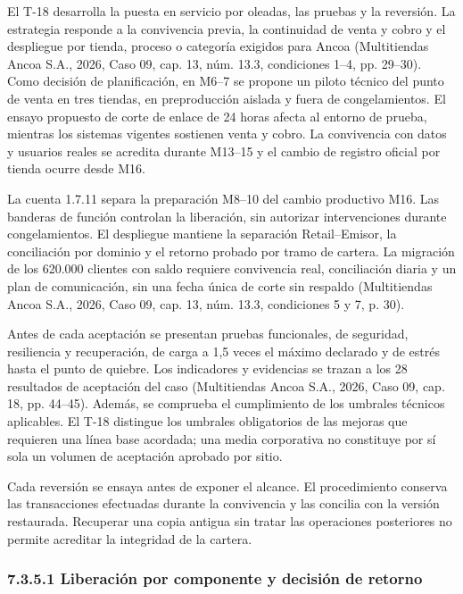 \documentclass[11pt]{article}
\begin{document}
El T-18 desarrolla la puesta en servicio por oleadas, las pruebas y la reversión. La estrategia responde a la convivencia previa, la continuidad de venta y cobro y el despliegue por tienda, proceso o categoría exigidos para Ancoa (Multitiendas Ancoa S.A., 2026, Caso 09, cap. 13, núm. 13.3, condiciones 1--4, pp. 29--30). Como decisión de planificación, en M6--7 se propone un piloto técnico del punto de venta en tres tiendas, en preproducción aislada y fuera de congelamientos. El ensayo propuesto de corte de enlace de 24 horas afecta al entorno de prueba, mientras los sistemas vigentes sostienen venta y cobro. La convivencia con datos y usuarios reales se acredita durante M13--15 y el cambio de registro oficial por tienda ocurre desde M16.

La cuenta 1.7.11 separa la preparación M8--10 del cambio productivo M16. Las banderas de función controlan la liberación, sin autorizar intervenciones durante congelamientos. El despliegue mantiene la separación Retail--Emisor, la conciliación por dominio y el retorno probado por tramo de cartera. La migración de los 620.000 clientes con saldo requiere convivencia real, conciliación diaria y un plan de comunicación, sin una fecha única de corte sin respaldo (Multitiendas Ancoa S.A., 2026, Caso 09, cap. 13, núm. 13.3, condiciones 5 y 7, p. 30).

Antes de cada aceptación se presentan pruebas funcionales, de seguridad, resiliencia y recuperación, de carga a 1,5 veces el máximo declarado y de estrés hasta el punto de quiebre. Los indicadores y evidencias se trazan a los 28 resultados de aceptación del caso (Multitiendas Ancoa S.A., 2026, Caso 09, cap. 18, pp. 44--45). Además, se comprueba el cumplimiento de los umbrales técnicos aplicables. El T-18 distingue los umbrales obligatorios de las mejoras que requieren una línea base acordada; una media corporativa no constituye por sí sola un volumen de aceptación aprobado por sitio.

Cada reversión se ensaya antes de exponer el alcance. El procedimiento conserva las transacciones efectuadas durante la convivencia y las concilia con la versión restaurada. Recuperar una copia antigua sin tratar las operaciones posteriores no permite acreditar la integridad de la cartera.

\subsubsection{7.3.5.1 Liberación por componente y decisión de retorno}
\end{document}
